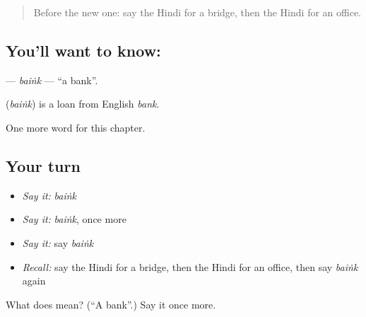 \label{lesson:HI-C153-baink}



\begin{quote}
Before the new one: say the Hindi for a bridge, then the Hindi for an office.
\end{quote}

\subsection*{You'll want to know: }
\textbf{} — \emph{baiṅk} — \textquotedblleft{}a bank\textquotedblright{}.

\begin{cousinweb}
\textbf{} (\emph{baiṅk}) is a loan from English \emph{bank}.
\end{cousinweb}

\begin{grammarlens}[title={What you've built}]
One more word for this chapter.
\end{grammarlens}

\subsection*{Your turn}
\begin{itemize}
\raggedright
  \item \emph{Say it:} \emph{baiṅk}
  \item \emph{Say it:} \emph{baiṅk}, once more
  \item \emph{Say it:} say \emph{baiṅk}
  \item \emph{Recall:} say the Hindi for a bridge, then the Hindi for an office, then say \emph{baiṅk} again
\end{itemize}

\begin{tcolorbox}[breakable,colback=teal!4,colframe=teal!35!black,title={Before you move on}]
What does  mean? (\textquotedblleft{}A bank\textquotedblright{}.) Say it once more.
\end{tcolorbox}
